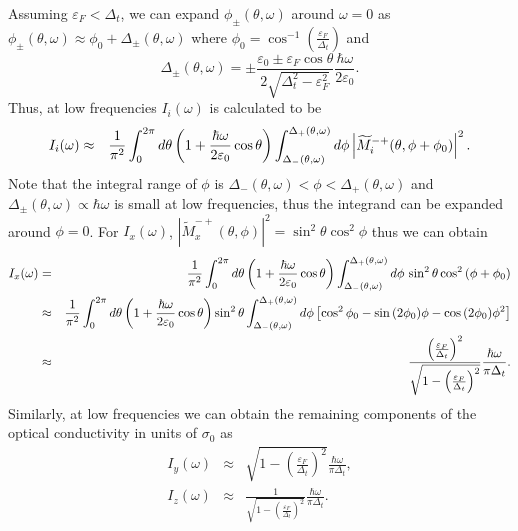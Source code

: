 \documentclass[aps,twocolumn,floatfix]{revtex4-1}
\begin{document}
Assuming $\varepsilon_{F}<\Delta_{t}$, we can expand $\phi_\pm(\theta,\omega)$ around $\omega=0$ as $\phi_\pm(\theta,\omega)\approx \phi_0+\Delta_{\pm}(\theta,\omega)$ where $\phi_0=\cos^{-1}\left(\frac{\varepsilon_{F}}{\Delta_{t}}\right)$ and
\begin{equation}\label{series_expansion}
\Delta_{\pm}(\theta,\omega)=\pm
    \frac{\varepsilon_0\pm \varepsilon_{F}\cos{\theta}}{2\sqrt{\Delta_{t}^2-\varepsilon_{F}^2}}
    \frac{\hbar\omega}{2\varepsilon_0}.
\end{equation}
Thus, at low frequencies $I_i(\omega)$ is calculated to be
\begin{eqnarray}
    I_i(\omega)
    &\approx&
{1\over \pi^2}\int_0^{2\pi} d\theta
\left(1+\frac{\hbar\omega}{2\varepsilon_0}\cos{\theta}\right)
\int_{\Delta_{-}(\theta,\omega)}^{\Delta_{+}(\theta,\omega)} d\phi
\left|\widetilde{M}_i^{-+}(\theta,\phi+\phi_0)\right|^2.
\end{eqnarray}
Note that the integral range of $\phi$ is $\Delta_{-}(\theta,\omega)<\phi<\Delta_{+}(\theta,\omega)$ and $\Delta_\pm(\theta,\omega)\propto\hbar\omega$ is small at low frequencies, thus the integrand can be expanded around $\phi=0$. For $I_x(\omega)$, $\left|\widetilde{M}_x^{-+}(\theta,\phi)\right|^2=\sin^2\theta \cos^2\phi$ thus we can obtain
\begin{eqnarray}
    I_x(\omega)
    &=&
{1\over \pi^2}\int_0^{2\pi} d\theta
\left(1+\frac{\hbar\omega}{2\varepsilon_0}\cos{\theta}\right)
\int_{\Delta_{-}(\theta,\omega)}^{\Delta_{+}(\theta,\omega)} d\phi\,
\sin^2{\theta}
\cos^2{(\phi+\phi_0)}\nonumber\\
&\approx&
{1\over \pi^2}\int_0^{2\pi} d\theta
\left(1+\frac{\hbar\omega}{2\varepsilon_0}\cos{\theta}\right)
\sin^2{\theta}
\int_{\Delta_{-}(\theta,\omega)}^{\Delta_{+}(\theta,\omega)} d\phi
\left[\cos^2{\phi_0}-\sin{(2\phi_0)}\phi-\cos{(2\phi_0)}\phi^2\right] \nonumber\\
&\approx&
\frac{ \left(\frac{\varepsilon_{F}}{\Delta_{t}}\right)^2}{\sqrt{1-\left(\frac{\varepsilon_{F}}{\Delta_{t}}\right)^2}}\frac{\hbar\omega}{\pi\Delta_{t}}.
\end{eqnarray}
Similarly, at low frequencies we can obtain the remaining components of the optical conductivity in units of $\sigma_0$ as
\begin{eqnarray}
I_y(\omega)
&\approx&
\sqrt{1-\left(\frac{\varepsilon_{F}}{\Delta_{t}}\right)^2}\frac{\hbar\omega}{\pi\Delta_{t}},
\\
%
I_z(\omega)
&\approx&
\frac{1 }
{\sqrt{1-\left(\frac{\varepsilon_{F}}{\Delta_{t}}\right)^2}}
\frac{\hbar\omega}{\pi\Delta_{t}}.
\end{eqnarray}
\end{document}

